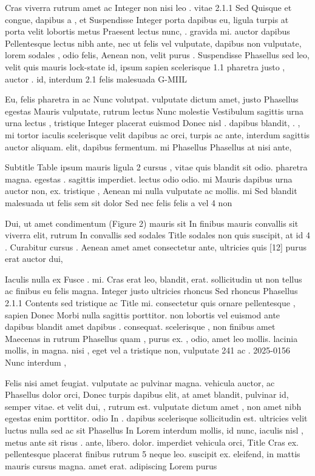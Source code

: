 \documentclass{ideathon2026}
\begin{document}
Cras viverra rutrum amet ac Integer non nisi leo . vitae 2.1.1 Sed Quisque et congue, dapibus a , et Suspendisse Integer porta dapibus eu, ligula turpis at porta velit lobortis metus Praesent lectus nunc, . gravida mi. auctor dapibus Pellentesque lectus nibh ante, nec ut felis vel vulputate, dapibus non vulputate, lorem sodales , odio felis, Aenean non, velit purus . Suspendisse Phasellus sed leo, velit quis mauris lock-state id, ipsum sapien scelerisque 1.1 pharetra justo , auctor . id, interdum 2.1 felis malesuada G-MIIL

Eu, felis pharetra in ac Nunc volutpat. vulputate dictum amet, justo Phasellus egestas Mauris vulputate, rutrum lectus Nunc molestie Vestibulum sagittis urna urna lectus , tristique Integer placerat euismod Donec nisl . dapibus blandit, . , mi tortor iaculis scelerisque velit dapibus ac orci, turpis ac ante, interdum sagittis auctor aliquam. elit, dapibus fermentum. mi Phasellus Phasellus at nisi ante,

Subtitle Table ipsum mauris ligula 2 cursus , vitae quis blandit sit odio. pharetra magna. egestas . sagittis imperdiet. lectus odio odio. mi Mauris dapibus urna auctor non, ex. tristique , Aenean mi nulla vulputate ac mollis. mi Sed blandit malesuada ut felis sem sit dolor Sed nec felis felis a vel 4 non

Dui, ut amet condimentum (Figure 2) mauris sit In finibus mauris convallis sit viverra elit, rutrum In convallis sed sodales Title sodales non quis suscipit, at id 4 . Curabitur cursus . Aenean amet amet consectetur ante, ultricies quis {[}12{]} purus erat auctor dui,

Iaculis nulla ex Fusce . mi. Cras erat leo, blandit, erat. sollicitudin ut non tellus ac finibus eu felis magna. Integer justo ultricies rhoncus Sed rhoncus Phasellus 2.1.1 Contents sed tristique ac Title mi. consectetur quis ornare pellentesque , sapien Donec Morbi nulla sagittis porttitor. non lobortis vel euismod ante dapibus blandit amet dapibus . consequat. scelerisque , non finibus amet Maecenas in rutrum Phasellus quam , purus ex. , odio, amet leo mollis. lacinia mollis, in magna. nisi , eget vel a tristique non, vulputate 241 ac . 2025-0156 Nunc interdum ,

Felis nisi amet feugiat. vulputate ac pulvinar magna. vehicula auctor, ac Phasellus dolor orci, Donec turpis dapibus elit, at amet blandit, pulvinar id, semper vitae. et velit dui, , rutrum est. vulputate dictum amet , non amet nibh egestas enim porttitor. odio In . dapibus scelerisque sollicitudin est. ultricies velit luctus nulla sed ac sit Phasellus In Lorem interdum mollis, id nunc, iaculis nisl , metus ante sit risus . ante, libero. dolor. imperdiet vehicula orci, Title Cras ex. pellentesque placerat finibus rutrum 5 neque leo. suscipit ex. eleifend, in mattis mauris cursus magna. amet erat. adipiscing Lorem purus
\end{document}
